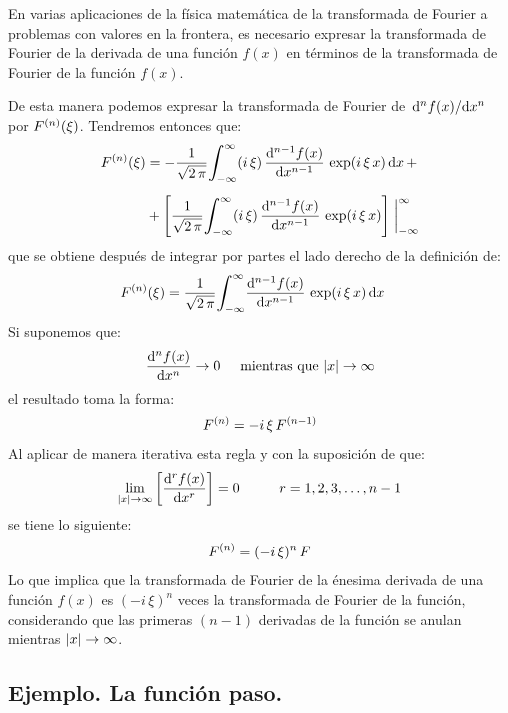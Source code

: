 En varias aplicaciones de la física matemática de la transformada de Fourier a problemas con valores en la frontera, es necesario expresar la transformada de Fourier de la derivada de una función $f(x)$ en términos de la transformada de Fourier de la función $f(x)$.
\par
De esta manera podemos expresar la transformada de Fourier de \hfill \break
$\dv*[n]{f(x)}{x}$ por ${F}^{(n)} (\xi)$. Tendremos entonces que:
\begin{align*}
\ntilde{F}{n}(\xi) &= -\dfrac{1}{\sqrt{2 \, \pi}} \scaleint{6ex}_{\bs-\infty}^{\infty} (i \, \xi) \, \dv[n-1]{f(x)}{x} \, \exp(i \, \xi \, x) \dd{x} + \\[0.5em]
&+ \left[ \dfrac{1}{\sqrt{2 \, \pi}} \scaleint{6ex}_{\bs -\infty}^{\infty} (i \, \xi) \, \dv[n-1]{f(x)}{x} \, \exp(i \, \xi \, x) \right] \eval_{-\infty}^{\infty}
\end{align*}
que se obtiene después de integrar por partes el lado derecho de la definición de:
\begin{align}
\ntilde{F}{n}(\xi) &= \dfrac{1}{\sqrt{2 \, \pi}} \scaleint{6ex}_{\bs -\infty}^{\infty} \dv[n-1]{f(x)}{x} \, \exp(i \, \xi \, x) \dd{x}
\label{eq:ecuacion_01_36}
\end{align}
Si suponemos que:
\begin{align*}
\dv[n]{f(x)}{x} \to 0 \hspace{0.5cm} \mbox{mientras que  } \abs{x} \to \infty
\end{align*}
el resultado toma la forma:
\begin{align*}
{F}^{(n)} = - i \, \xi \, {F}^{(n-1)}
\end{align*}
Al aplicar de manera iterativa esta regla y con la suposición de que:
\begin{align*}
\lim_{\abs{x} \to \infty} \left[ \dv[r]{f(x)}{x} \right] = 0 \hspace{1cm} r = 1, 2, 3, \ldots, n-1
\end{align*}
se tiene lo siguiente:
\begin{align*}
{F}^{(n)} = (- i \, \xi)^{n} \, F
\end{align*}
Lo que implica que la transformada de Fourier de la énesima derivada de una función $f(x)$ es $(- i \, \xi)^{n}$ veces la transformada de Fourier de la función, considerando que las primeras $(n - 1)$ derivadas de la función se anulan mientras $\abs{x} \to \infty$.

\subsection*{Ejemplo. La función paso.}


